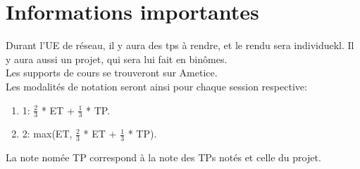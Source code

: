\section{Informations importantes}
Durant l'UE de réseau, il y aura des tps à rendre, et le rendu sera individuekl. Il y aura aussi un projet,
qui sera lui fait en binômes.\\
Les supports de cours se trouveront sur Ametice.\\
Les modalités de notation seront ainsi pour chaque session respective:
\begin{enumerate}
	\item 1: $\frac{2}{3}$ * ET + $\frac{1}{3}$ * TP.
	\item 2: max(ET, $\frac{2}{3}$ * ET + $\frac{1}{3}$ * TP).
\end{enumerate}

La note nomée TP correspond à la note des TPs notés et celle du projet.
